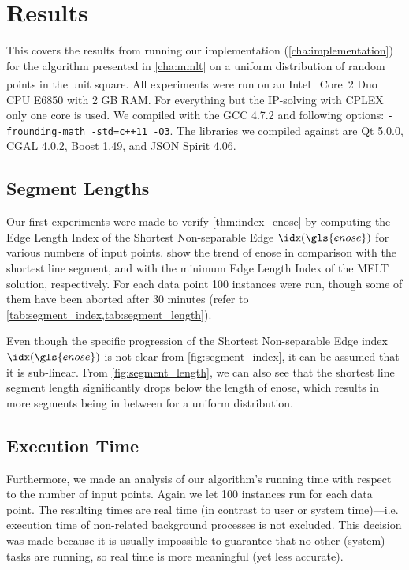 \chapter{Results}
\label{cha:results}
This  covers the results from running our
implementation (\cref{cha:implementation}) for the algorithm presented
in \cref{cha:mmlt} on a uniform distribution of random points in the
unit square.
All experiments were run on an Intel\textsuperscript{\textregistered}~%
Core\texttrademark~2 Duo CPU E6850 with 2 GB RAM. For everything but
the IP-solving with CPLEX only one core is used. We compiled with the
GCC 4.7.2 and following options: \verb|-frounding-math -std=c++11 -O3|.
The libraries we compiled against are Qt 5.0.0, CGAL 4.0.2, Boost 1.49,
and JSON Spirit 4.06.

\section{Segment Lengths}
\label{sec:results_segments}
Our first experiments were made to verify \cref{thm:index_enose} by
computing the Edge Length Index of the Shortest Non-separable Edge
\(\idx(\gls{enose})\) for various numbers of input points.
 show the trend of
\gls{enose} in comparison with the shortest line segment, and
with the minimum Edge Length Index of the \gls{MELT} solution, respectively.
For each data point 100 instances were run, though some of them have
been aborted after 30 minutes
(refer to \cref{tab:segment_index,tab:segment_length}).

Even though the specific progression of the Shortest Non-separable
Edge index \(\idx(\gls{enose})\) is not clear from \cref{fig:segment_index}, it can be
assumed that it is sub-linear. From \cref{fig:segment_length}, we can
also see that the shortest line segment length significantly drops below
the length of \gls{enose}, which results in more
segments being in between for a uniform distribution.

\section{Execution Time}
Furthermore, we made an analysis of our algorithm's running time
with respect to the number of input points. Again we let 100 instances 
run for each data point. The resulting times are real time (in contrast 
to user or system time)---i.e. execution time of non-related background 
processes is not excluded. This decision was made because it is usually 
impossible to guarantee that no other (system) tasks are running, so real 
time is more meaningful (yet less accurate).


